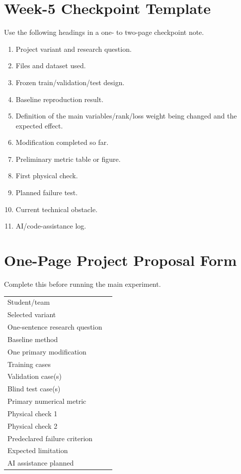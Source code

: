 \documentclass[11pt]{article}
\begin{document}
\section{Week-5 Checkpoint Template}
Use the following headings in a one- to two-page checkpoint note.
\begin{enumerate}
\item Project variant and research question.
\item Files and dataset used.
\item Frozen train/validation/test design.
\item Baseline reproduction result.
\item Definition of the main variables/rank/loss weight being changed and the expected effect.
\item Modification completed so far.
\item Preliminary metric table or figure.
\item First physical check.
\item Planned failure test.
\item Current technical obstacle.
\item AI/code-assistance log.
\end{enumerate}


\section{One-Page Project Proposal Form}
Complete this before running the main experiment.

{\renewcommand{\arraystretch}{1.32}
\begin{tabularx}{\textwidth}{@{}p{}Y@{}}
\toprule
Student/team & \hrulefill \\
Selected variant & \hrulefill \\
One-sentence research question & \hrulefill \\
Baseline method & \hrulefill \\
One primary modification & \hrulefill \\
Training cases & \hrulefill \\
Validation case(s) & \hrulefill \\
Blind test case(s) & \hrulefill \\
Primary numerical metric & \hrulefill \\
Physical check 1 & \hrulefill \\
Physical check 2 & \hrulefill \\
Predeclared failure criterion & \hrulefill \\
Expected limitation & \hrulefill \\
AI assistance planned & \hrulefill \\
\bottomrule
\end{tabularx}
}
\end{document}
